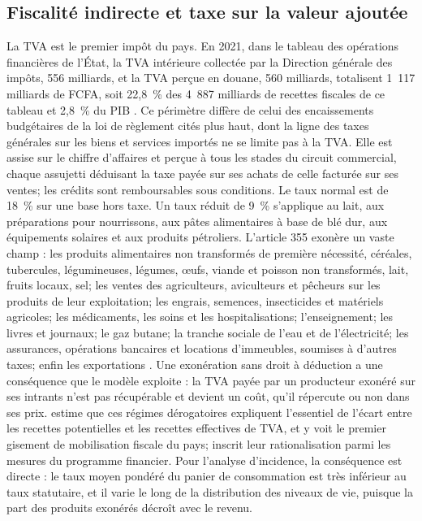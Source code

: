 \documentclass[11pt,a4paper]{article}
\begin{document}
\subsection{Fiscalité indirecte et taxe sur la valeur ajoutée}

La TVA est le premier impôt du pays. En 2021, dans le tableau des opérations
financières de l'État, la TVA intérieure collectée par la Direction générale
des impôts, 556 milliards, et la TVA perçue en douane, 560 milliards,
totalisent 1~117 milliards de FCFA, soit 22,8~\% des 4~887 milliards de
recettes fiscales de ce tableau et 2,8~\% du PIB \citep{anstat2023}. Ce
périmètre diffère de celui des encaissements budgétaires de la loi de règlement
cités plus haut, dont la ligne des taxes générales sur les biens et services
importés ne se limite pas à la TVA. Elle est assise sur le chiffre
d'affaires et perçue à tous les stades du circuit commercial, chaque assujetti
déduisant la taxe payée sur ses achats de celle facturée sur ses ventes; les
crédits sont remboursables sous conditions. Le taux normal est de 18~\% sur une
base hors taxe. Un taux réduit de 9~\% s'applique au lait, aux préparations
pour nourrissons, aux pâtes alimentaires à base de blé dur, aux équipements
solaires et aux produits pétroliers. L'article 355 exonère un vaste champ :
les produits alimentaires non transformés de première nécessité, céréales,
tubercules, légumineuses, légumes, œufs, viande et poisson non transformés,
lait, fruits locaux, sel; les ventes des agriculteurs, aviculteurs et pêcheurs
sur les produits de leur exploitation; les engrais, semences, insecticides et
matériels agricoles; les médicaments, les soins et les hospitalisations;
l'enseignement; les livres et journaux; le gaz butane; la tranche sociale de
l'eau et de l'électricité; les assurances, opérations bancaires et locations
d'immeubles, soumises à d'autres taxes; enfin les exportations
\citep{civcgi2021,dgi2025impots}. Une exonération sans droit à déduction a une
conséquence que le modèle exploite : la TVA payée par un producteur exonéré sur
ses intrants n'est pas récupérable et devient un coût, qu'il répercute ou non
dans ses prix. \citet{worldbank2019} estime que ces régimes dérogatoires
expliquent l'essentiel de l'écart entre les recettes potentielles et les
recettes effectives de TVA, et y voit le premier gisement de mobilisation
fiscale du pays; \citet{imf2023} inscrit leur rationalisation parmi les mesures
du programme financier. Pour l'analyse d'incidence, la conséquence est
directe : le taux moyen pondéré du panier de consommation est très inférieur au
taux statutaire, et il varie le long de
la distribution des niveaux de vie, puisque la part des produits exonérés
décroît avec le revenu.
\end{document}
